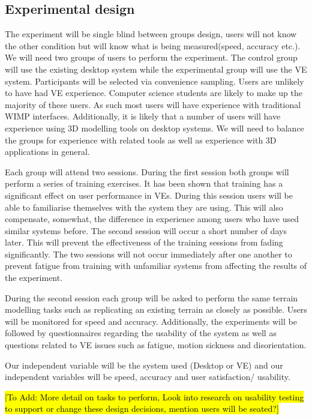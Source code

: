 \documentclass{sig-alternate-05-2015}
\begin{document}
\subsection{Experimental design}
The experiment will be single blind between groups design, users will not know the other condition but will know what is being measured(speed, accuracy etc.). We will need two groups of users to perform the experiment. The control group will use the existing desktop system while the experimental group will use the VE system. Participants will be selected via convenience sampling. Users are unlikely to have had VE experience. Computer science students are likely to make up the majority of these users. As such most users will have experience with traditional WIMP interfaces. Additionally, it is likely that a number of users will have experience using 3D modelling tools on desktop systems. We will need to balance the groups for experience with related tools as well as experience with 3D applications in general.

Each group will attend two sessions. During the first session both groups will perform a series of training exercises. It has been shown that training has a significant effect on user performance in VEs\cite{Schultheis2012}. During this session users will be able to familiarise themselves with the system they are using. This will also compensate, somewhat, the difference in experience among users who have used similar systems before. The second session will occur a short number of days later. This will prevent the effectiveness of the training sessions from fading significantly. The two sessions will not occur immediately after one another to prevent fatigue from training with unfamiliar systems from affecting the results of the experiment.

During the second session each group will be asked to perform the same terrain modelling tasks such as replicating an existing terrain as closely as possible. Users will be monitored for speed and accuracy. Additionally, the experiments will be followed by questionnaires regarding the usability of the system as well as questions related to VE issues such as fatigue, motion sickness and disorientation.

Our independent variable will be the system used (Desktop or VE) and our independent variables will be speed, accuracy and user satisfaction/ usability.

\hl{[To Add: More detail on tasks to perform, Look into research on usability testing to support or change these design decisions, mention users will be seated?]}
\end{document}
